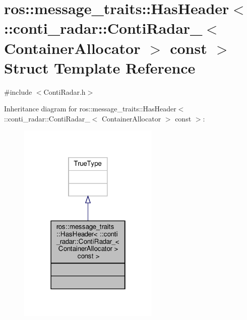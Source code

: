 \hypertarget{structros_1_1message__traits_1_1HasHeader_3_01_1_1conti__radar_1_1ContiRadar___3_01ContainerAllocator_01_4_01const_01_4}{}\section{ros\+:\+:message\+\_\+traits\+:\+:Has\+Header$<$ \+:\+:conti\+\_\+radar\+:\+:Conti\+Radar\+\_\+$<$ Container\+Allocator $>$ const $>$ Struct Template Reference}
\label{structros_1_1message__traits_1_1HasHeader_3_01_1_1conti__radar_1_1ContiRadar___3_01ContainerAllocator_01_4_01const_01_4}


{\ttfamily \#include $<$Conti\+Radar.\+h$>$}



Inheritance diagram for ros\+:\+:message\+\_\+traits\+:\+:Has\+Header$<$ \+:\+:conti\+\_\+radar\+:\+:Conti\+Radar\+\_\+$<$ Container\+Allocator $>$ const $>$\+:\nopagebreak
\begin{figure}[H]
\begin{center}
\leavevmode
\includegraphics[width=190pt]{d2/d4a/structros_1_1message__traits_1_1HasHeader_3_01_1_1conti__radar_1_1ContiRadar___3_01ContainerAllof2a1b969d4aa309ed6bac8f0cd574bdb}
\end{center}
\end{figure}


